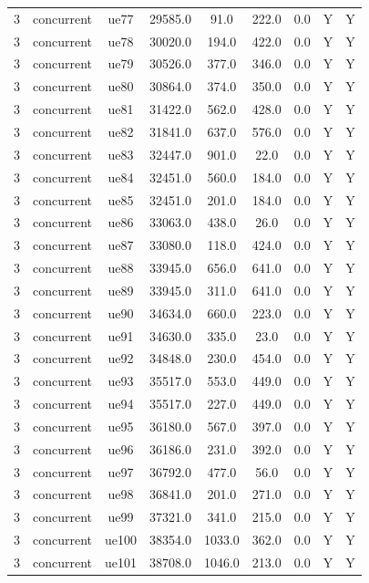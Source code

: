 \begin{table}[ht]
\begin{tabular}{|c|c|c|c|c|c|c|c|c|}
3 & concurrent & ue77 & 29585.0 & 91.0 & 222.0 & 0.0 & Y & Y \\
3 & concurrent & ue78 & 30020.0 & 194.0 & 422.0 & 0.0 & Y & Y \\
3 & concurrent & ue79 & 30526.0 & 377.0 & 346.0 & 0.0 & Y & Y \\
3 & concurrent & ue80 & 30864.0 & 374.0 & 350.0 & 0.0 & Y & Y \\
3 & concurrent & ue81 & 31422.0 & 562.0 & 428.0 & 0.0 & Y & Y \\
3 & concurrent & ue82 & 31841.0 & 637.0 & 576.0 & 0.0 & Y & Y \\
3 & concurrent & ue83 & 32447.0 & 901.0 & 22.0 & 0.0 & Y & Y \\
3 & concurrent & ue84 & 32451.0 & 560.0 & 184.0 & 0.0 & Y & Y \\
3 & concurrent & ue85 & 32451.0 & 201.0 & 184.0 & 0.0 & Y & Y \\
3 & concurrent & ue86 & 33063.0 & 438.0 & 26.0 & 0.0 & Y & Y \\
3 & concurrent & ue87 & 33080.0 & 118.0 & 424.0 & 0.0 & Y & Y \\
3 & concurrent & ue88 & 33945.0 & 656.0 & 641.0 & 0.0 & Y & Y \\
3 & concurrent & ue89 & 33945.0 & 311.0 & 641.0 & 0.0 & Y & Y \\
3 & concurrent & ue90 & 34634.0 & 660.0 & 223.0 & 0.0 & Y & Y \\
3 & concurrent & ue91 & 34630.0 & 335.0 & 23.0 & 0.0 & Y & Y \\
3 & concurrent & ue92 & 34848.0 & 230.0 & 454.0 & 0.0 & Y & Y \\
3 & concurrent & ue93 & 35517.0 & 553.0 & 449.0 & 0.0 & Y & Y \\
3 & concurrent & ue94 & 35517.0 & 227.0 & 449.0 & 0.0 & Y & Y \\
3 & concurrent & ue95 & 36180.0 & 567.0 & 397.0 & 0.0 & Y & Y \\
3 & concurrent & ue96 & 36186.0 & 231.0 & 392.0 & 0.0 & Y & Y \\
3 & concurrent & ue97 & 36792.0 & 477.0 & 56.0 & 0.0 & Y & Y \\
3 & concurrent & ue98 & 36841.0 & 201.0 & 271.0 & 0.0 & Y & Y \\
3 & concurrent & ue99 & 37321.0 & 341.0 & 215.0 & 0.0 & Y & Y \\
3 & concurrent & ue100 & 38354.0 & 1033.0 & 362.0 & 0.0 & Y & Y \\
3 & concurrent & ue101 & 38708.0 & 1046.0 & 213.0 & 0.0 & Y & Y \\

\end{tabular}
\end{table}
